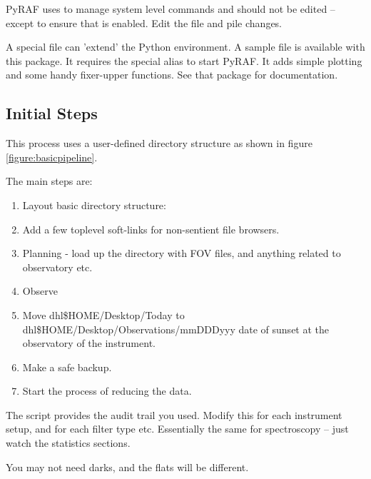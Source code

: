 PyRAF uses  to manage system level commands and should
not be edited -- except to ensure that  is
enabled. Edit the  file and pile changes.

A special  file can 'extend' the Python
environment.  A sample file is available with this package. It
requires the special alias to start PyRAF. It adds simple
 plotting and some handy fixer-upper functions. See
that package for documentation. 

\subsection{Initial Steps}

This process uses a user-defined  directory structure as shown in
figure \ref{figure:basicpipeline}. 

The main steps are:
\vspace{-.15cm}
\begin{enumerate}\addtolength{\itemsep}{-0.5\baselineskip}
   \item   Layout basic directory structure:


   \item  Add a few toplevel soft-links for non-sentient file browsers.

   \item   Planning - load up the  directory with
FOV files, and anything related to observatory etc.

   \item   Observe
   \item   Move dhl{\$HOME/Desktop/Today} to dhl{\$HOME/Desktop/Observations/mmDDDyyy}
date of sunset at the observatory of the instrument.
   \item   Make a safe backup.
   \item   Start the process of reducing the data.
\end{enumerate}

The script provides the audit trail you used. Modify this for each
instrument setup, and for each filter type etc.  Essentially the same
for spectroscopy -- just watch the statistics sections.

You may not need darks, and the flats will be different.

